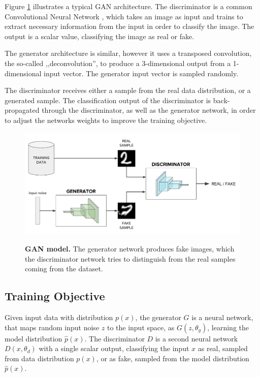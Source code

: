 \documentclass[12pt]{report}
\begin{document}
Figure \ref{fig:gan} illustrates a typical GAN architecture. The discriminator is a common Convolutional Neural Network \cite{lecun_convolutional_1995}, which takes an image as input and trains to extract necessary information from the input in order to classify the image. The output is a scalar value, classifying the image as real or fake.

The generator architecture is similar, however it uses a transposed convolution, the so-called ,,deconvolution'', to produce a 3-dimensional output from a 1-dimensional input vector. The generator input vector is sampled randomly.

The discriminator receives either a sample from the real data distribution, or a generated sample. The classification output of the discriminator is back-propagated  through the discriminator, as well as the generator network, in order to adjust the networks weights to improve the training objective.

\begin{figure}[h]
\centering
{\includegraphics[width=\linewidth]{02_background/gan_model}}
\caption{\label{fig:gan} \textbf{GAN model.} The generator network produces fake images, which the discriminator network tries to distinguish from the real samples coming from the dataset.}
\end{figure}

\subsection{Training Objective} \label{sec:GAN_training}

Given input data with distribution $p(x)$, the generator $G$ is a neural network, that maps random input noise $z$ to the input space, as $G(z, \theta_{g})$, learning the model distribution $\hat{p}(x)$. The discriminator $D$ is a second neural network $D(x, \theta_{d})$ with a single scalar output, classifying the input $x$ as real, sampled from data distribution $p(x)$, or as fake, sampled from the model distribution $\hat{p}(x)$. 
\end{document}
